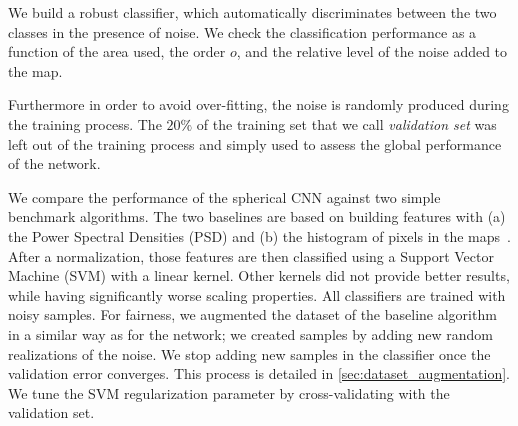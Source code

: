 \documentclass[final,twocolumn,3p,times,authoryear]{elsarticle}
\newcommand{\1}{\b{1}}              %
\newcommand{\0}{\b{0}}              %
\begin{document}
We build a robust classifier, which automatically discriminates between the two classes in the presence of noise.
We check the classification performance as a function of the area used, the order $o$, and the relative level of the noise added to the map.

Furthermore in order to avoid over-fitting, the noise is randomly produced during the training process.
The $20\%$ of the training set that we call \emph{validation set} was left out of the training process and simply used to assess the global performance of the network.


We compare the performance of the spherical CNN against two simple benchmark algorithms.
The two baselines are based on building features with
(a) the Power Spectral Densities (PSD) and
(b) the histogram of pixels in the maps~\cite{patton2017cosmologicalconstraints}.
After a normalization, those features are then classified using a Support Vector Machine (SVM) with a linear kernel.
Other kernels did not provide better results, while having significantly worse scaling properties.
All classifiers are trained with noisy samples.
For fairness, we augmented the dataset of the baseline algorithm in a similar way as for the network; we created samples by adding new random realizations of the noise.
We stop adding new samples in the classifier once the validation error converges.
This process is detailed in \ref{sec:dataset_augmentation}.
We tune the SVM regularization parameter by cross-validating with the validation set.
\end{document}
